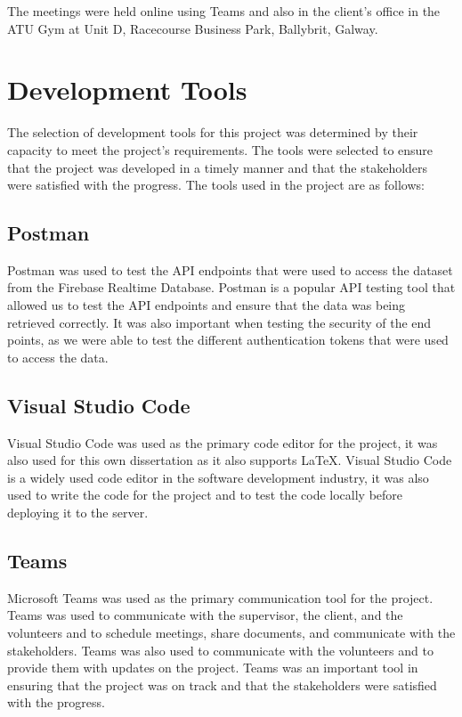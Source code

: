 The meetings were held online using Teams and also in the client's office in the ATU Gym at Unit D, Racecourse Business Park, Ballybrit, Galway. 

\section{Development Tools}
The selection of development tools for this project was determined by their capacity to meet the project's requirements.
The tools were selected to ensure that the project was developed in a timely manner and that the stakeholders were satisfied with the progress. 
The tools used in the project are as follows:

\subsection{Postman}
Postman was used to test the API endpoints that were used to access the dataset from the Firebase Realtime Database. Postman is a popular API testing tool
that allowed us to test the API endpoints and ensure that the data was being retrieved correctly. It was also important when testing the security of the end points, 
as we were able to test the different authentication tokens that were used to access the data.

\subsection{Visual Studio Code}
Visual Studio Code was used as the primary code editor for the project, it was also used for this own dissertation as it also supports \LaTeX. Visual Studio Code 
is a widely used code editor in the software development industry, it was also used to write the code for the project and to test the 
code locally before deploying it to the server.

\subsection{Teams}
Microsoft Teams was used as the primary communication tool for the project. Teams was used to communicate with the supervisor, the client, and the volunteers and to 
schedule meetings, share documents, and communicate with the stakeholders. Teams was also used to communicate with the volunteers and to provide them
with updates on the project. Teams was an important tool in ensuring that the project was on track and that the stakeholders were satisfied with the progress.

